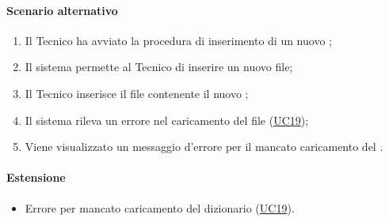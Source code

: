 \paragraph*{Scenario alternativo}
\begin{enumerate}
  \item Il Tecnico ha avviato la procedura di inserimento di un nuovo ;
  \item Il sistema permette al Tecnico di inserire un nuovo file;
  \item Il Tecnico inserisce il file contenente il nuovo ;
  \item Il sistema rileva un errore nel caricamento del file (\hyperref[UC19]{UC19});
  \item Viene visualizzato un messaggio d'errore per il mancato caricamento del .
\end{enumerate}

\paragraph*{Estensione}
\begin{itemize}
  \item Errore per mancato caricamento del dizionario (\hyperref[UC19]{UC19}).
\end{itemize}
